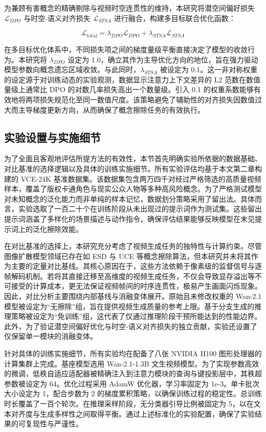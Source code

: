 为兼顾有害概念的精确剔除与视频时空连贯性的维持，本研究将潜空间偏好损失 $\mathcal{L}_{DPO}$ 与时空-语义对齐损失 $\mathcal{L}_{STSA}$ 进行融合，构建多目标联合优化函数：

\begin{equation}
\mathcal{L}_{\text{total}} = \lambda_{DPO} \mathcal{L}_{DPO} + \lambda_{STSA} \mathcal{L}_{STSA}
\end{equation}

在多目标优化体系中，不同损失项之间的梯度量级平衡直接决定了模型的收敛行为。本研究将 $\lambda_{DPO}$ 设定为 1.0，确立其作为主导优化方向的地位，旨在强力驱动模型参数向概念遗忘区域收敛。与此同时，$\lambda_{STSA}$ 被设定为 0.1。这一非对称权重的设定源于对训练动态的实验观测，数据显示注意力上下文差异的 L2 范数在数值量级上通常比 DPO 的对数几率损失高出一个数量级。引入 0.1 的权重系数能够有效地将两项损失规范化至同一数值尺度。该策略避免了辅助性的对齐损失因数值过大而主导梯度更新方向，从而确保了概念擦除任务的有效执行。

\subsection{实验设置与实施细节}

为了全面且客观地评估所提方法的有效性，本节首先明确实验所依据的数据基础、对比基准的选择逻辑以及具体的训练实施细节。所有实验评估均基于本文第二章构建的 VCE-24K 基准数据集。该数据集包含两万四千对经过严格筛选的高质量视频样本，覆盖了版权卡通角色与现实公众人物等多种高风险概念。为了严格测试模型对未知概念的泛化能力而非单纯的样本记忆，数据划分策略采用了留出法。具体而言，实验选取了一百二十个在训练阶段从未出现过的提示词作为测试集。这些留出提示词涵盖了多样化的场景描述与动作指令，确保评估结果能够反映模型在未见提示词上的泛化擦除效能。

在对比基准的选择上，本研究充分考虑了视频生成任务的独特性与计算约束。尽管图像扩散模型领域已存在如 ESD 与 UCE 等概念擦除算法，但本研究并未将其作为主要的定量对比基线。其核心原因在于，这些方法依赖于像素级的监督信号与逐帧解码机制。若将其直接迁移至高维度的视频生成任务，不仅会导致显存溢出等不可接受的计算成本，更无法保证视频帧间的时序连贯性，极易产生画面闪烁现象。因此，对比分析主要围绕内部基线与消融变体展开。原始且未修改权重的 Wan-2.1 模型被设定为“无擦除”组，旨在提供视频生成质量的参考上限。基于分支生成的推理策略被设定为“免训练”组，这代表了仅通过推理阶段干预所能达到的性能边界。此外，为了验证潜空间偏好优化与时空-语义对齐损失的独立贡献，实验还设置了仅保留单一模块的消融变体。

针对具体的训练实施细节，所有实验均在配备了八张 NVIDIA H100 图形处理器的计算集群上完成。基座模型选用 Wan-2.1-1.3B 文生视频模型。为了实现参数高效的微调，低秩自适应适配器被精确注入到注意力模块的查询与键投影层中，其秩超参数被设定为 64。优化过程采用 AdamW 优化器，学习率固定为 1e-3。单卡批次大小设定为 1，配合步数为 2 的梯度累积策略，以确保训练过程的稳定性。总训练时长覆盖了一百个轮次。在推理采样阶段，无分类器引导比例被固定为 5，以在文本对齐度与生成多样性之间取得平衡。通过上述标准化的实验配置，确保了实验结果的可复现性与严谨性。



